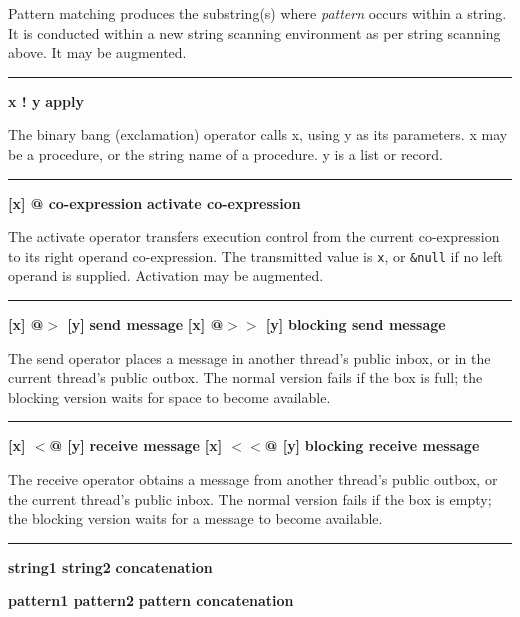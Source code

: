 \noindent
{}Pattern matching produces the substring(s) where
\textit{pattern} occurs within a string. It is conducted within a new
string scanning environment as per string scanning above. It may be augmented.

\bigskip\hrule\vspace{0.1cm}
\noindent
{\bf x ! y } \hfill {\bf apply}

\noindent
{}The binary bang (exclamation) operator calls x,
using y as its parameters.  x may be a procedure, or the string name of
a procedure.  y is a list or record.

\bigskip\hrule\vspace{0.1cm}
\noindent
{\bf [x] @ co-expression } \hfill {\bf activate co-expression}

\noindent
The activate operator transfers execution
control from the current co-expression to its right operand
co-expression. The transmitted value is \texttt{x}, or \texttt{\&null}
if no left operand is supplied. Activation may be augmented.

\bigskip\hrule\vspace{0.1cm}
\noindent
{\bf [x] @$>$ [y] } \hfill {\bf send message}
 \linebreak
\noindent
{\bf [x] @$>>$ [y] } \hfill {\bf blocking send message}

\noindent
The send operator places a message in another thread's public
inbox, or in the current thread's public outbox. The normal version fails
if the box is full; the blocking version waits for space to become
available.

\bigskip\hrule\vspace{0.1cm}
\noindent
{\bf [x] $<$@ [y] } \hfill {\bf receive message}
 \linebreak
\noindent
{\bf [x] $<<$@ [y] } \hfill {\bf blocking receive message}

\noindent
The receive operator obtains a message from another thread's public
outbox, or the current thread's public inbox. The normal version fails
if the box is empty; the blocking version waits for a message to become
available.

\bigskip\hrule\vspace{0.1cm}
\noindent
{\bf string1 {\textbar}{\textbar} string2 } \hfill {\bf concatenation}

\noindent
{\bf pattern1 {\textbar}{\textbar} pattern2 } \hfill {\bf pattern concatenation}

